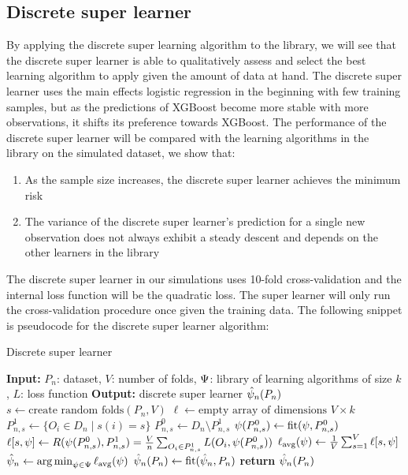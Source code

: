 \documentclass[./main.tex]{subfiles}
\begin{document}
\subsection{Discrete super learner}
By applying the discrete super learning algorithm to the library, we will see that the discrete super learner is able to qualitatively assess and select the best learning algorithm to apply given the amount of data at hand. The discrete super learner uses the main effects logistic regression in the beginning with few training samples, but as the predictions of XGBoost become more stable with more observations, it shifts its preference towards XGBoost. The performance of the discrete super learner will be compared with the learning algorithms in the library on the simulated dataset, we show that:
\begin{enumerate}
    \item As the sample size increases, the discrete super learner achieves the minimum risk 
    \item The variance of the discrete super learner's prediction for a single new observation does not always exhibit a steady descent and depends on the other learners in the library
\end{enumerate}
The discrete super learner in our simulations uses 10-fold cross-validation and the internal loss function will be the quadratic loss. The super learner will only run the cross-validation procedure once given the training data. The following snippet is pseudocode for the discrete super learner algorithm:
\begin{algorithm}[H]
\caption{Discrete super learner}
\begin{algorithmic}[1]
\State \textbf{Input:} $P_n$: dataset, $V$: number of folds, $ \Psi $: library of learning algorithms of size $ k $, $ L $: loss function
\State \textbf{Output:} discrete super learner $ \hat{\psi}_n(P_n) $
\State $s \gets \text{create random folds}(P_n, V)$ 
\State $\ell \gets \text{empty array of dimensions } V \times k$  
    \State $P_{n, s}^{1} \gets \{O_i \in D_n \mid s(i) = s\} $
    \State $P_{n, s}^{0} \gets D_n \setminus P_{n,s}^{1} $
    \For{$\la \in \lib$}
    \State $ \psi(P_{n,s}^{0}) \gets \text{fit}(\psi, P_{n, s}^{0})$
    \State $\ell[s,\psi] \gets R(\psi(P_{n, s}^{0}), P_{n,s}^{1}) = \frac{V}{n} \sum_{O_i \in P_{n,s}^{1}} L(O_i, \psi(P_{n, s}^{0})) $
    \EndFor
\EndFor
\For{$\la \in \lib$}
    \State $ \ell_{\text{avg}}(\psi) \gets \frac{1}{V} \sum_{s = 1}^{V} \ell[s,\psi] $ 
\EndFor
\State $ \hat{\psi}_n \gets \operatorname*{arg\,min}_{\psi \in \Psi} \ell_{\text{avg}}(\psi) $
\State $ \hat{\psi}_n(P_n) \gets \text{fit}(\hat{\psi}_n, P_n) $  
\State \textbf{return} $ \hat{\psi}_n(P_n) $
\end{algorithmic}
\end{algorithm}
\end{document}
